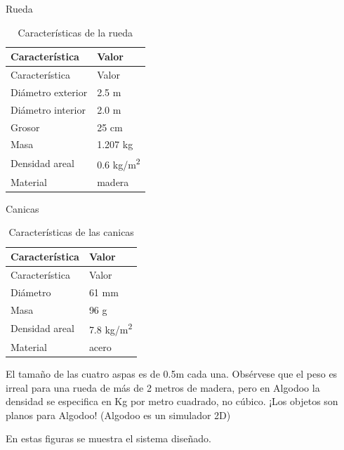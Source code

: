 \documentclass[
  10pt,
  a4paper,
  DIV=11,
  numbers=noendperiod,
  open=any]{scrreprt}
\numberwithin{equation}{chapter}
\numberwithin{equation}{section}
\renewcommand{\[}{\begin{equation}}
\renewcommand{\]}{\end{equation}}
\begin{document}
Rueda
\begin{longtable}{@{}ll@{}}
\caption{Características de la rueda}\label{tab:rueda}\\
\toprule
Característica & Valor\\
\midrule
\endfirsthead
\toprule
Característica & Valor\\
\midrule
\endhead
\bottomrule
\endfoot
\bottomrule
\endlastfoot
Diámetro exterior & 2.5 m\\
Diámetro interior & 2.0 m\\
Grosor            & 25 cm\\
Masa              & 1.207 kg\\
Densidad areal    & 0.6 kg/m\textsuperscript{2}\\
Material          & madera\\
\end{longtable}

Canicas
\begin{longtable}{@{}ll@{}}
\caption{Características de las canicas}\label{tab:canicas}\\
\toprule
Característica & Valor\\
\midrule
\endfirsthead
\toprule
Característica & Valor\\
\midrule
\endhead
\bottomrule
\endfoot
\bottomrule
\endlastfoot
Diámetro        & 61 mm\\
Masa            & 96 g\\
Densidad areal  & 7.8 kg/m\textsuperscript{2}\\
Material        & acero\\
\end{longtable}


El tamaño de las cuatro aspas es de 0.5m cada una. Obsérvese que el peso es irreal para una rueda de más de 2 metros de madera, pero en Algodoo la densidad se especifica en Kg por metro cuadrado, no cúbico. ¡Los objetos son planos para Algodoo! (Algodoo es un simulador 2D) 

En estas figuras se muestra el sistema diseñado.
\end{document}
